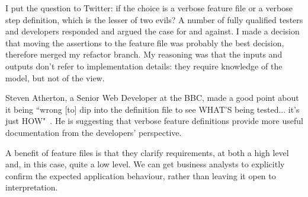 I put the question to Twitter: if the choice is a verbose feature file or a verbose step definition, which is the lesser of two evils? A number of fully qualified testers and developers responded and argued the case for and against. I made a decision that moving the assertions to the feature file was probably the best decision, therefore merged my refactor branch. My reasoning was that the inputs and outputs don’t refer to implementation details: they require knowledge of the model, but not of the view.

Steven Atherton, a Senior Web Developer at the BBC, made a good point about it being ``wrong [to] dip into the definition file to see WHAT'S being tested... it's just HOW"~\cite{appendix:cucumber:steven}. He is suggesting that verbose feature definitions provide more useful documentation from the developers' perspective.

A benefit of feature files is that they clarify requirements, at both a high level and, in this case, quite a low level. We can get business analysts to explicitly confirm the expected application behaviour, rather than leaving it open to interpretation.